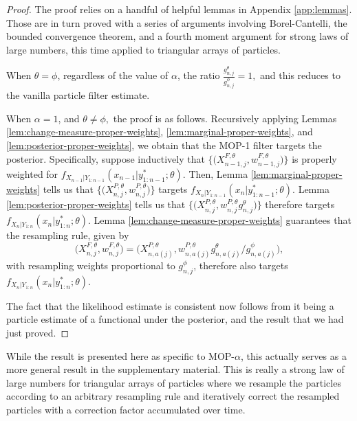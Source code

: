 \documentclass{article}
\begin{document}
\begin{proof}
    The proof relies on a handful of helpful lemmas in Appendix \ref{app:lemmas}. Those are in turn proved with a series of arguments involving Borel-Cantelli, the bounded convergence theorem, and a fourth moment argument for strong laws of large numbers, this time applied to triangular arrays of particles.
    
    When $\theta=\phi$, regardless of the value of $\alpha$, the ratio $\frac{g_{n,j}^\theta}{g_{n,j}^\phi}=1,$ and this reduces to the vanilla particle filter estimate.

    When $\alpha=1$, and $\theta\neq\phi,$ the proof is as follows. Recursively applying Lemmas \ref{lem:change-measure-proper-weights}, \ref{lem:marginal-proper-weights}, and \ref{lem:posterior-proper-weights}, we obtain that 
    the MOP-1 filter targets the posterior.
    Specifically, suppose inductively that $\big\{\big(X^{F,\theta}_{n-1,j},w^{F,\theta}_{n-1,j}\big)\big\}$ is properly weighted for $f_{X_{n-1}|Y_{1:n-1}}(x_{n-1}|y^*_{1:n-1};\theta)$.
    Then, Lemma \ref{lem:marginal-proper-weights} tells us that $\big\{\big(X^{P,\theta}_{n,j},w^{P,\theta}_{n,j}\big)\big\}$ targets $f_{X_{n}|Y_{1:n-1}}(x_{n}|y^*_{1:n-1};\theta)$.
    Lemma \ref{lem:posterior-proper-weights} tells us that $\big\{\big(X^{P,\theta}_{n,j},w^{P,\theta}_{n,j} g^\theta_{n,j} \big)\big\}$ therefore targets  $f_{X_{n}|Y_{1:n}}(x_{n}|y^*_{1:n};\theta)$.
    Lemma \ref{lem:change-measure-proper-weights} guarantees that the resampling rule, given by 
    \[
    \big(X^{F,\theta}_{n,j},w^{F,\theta}_{n,j}\big) = \big(X^{P,\theta}_{n,a(j)}, w^{P,\theta}_{n,a(j)} g^\theta_{n,a(j)}\big/ g^\phi_{n,a(j)}\big),
    \]
    with resampling weights proportional to $g^\phi_{n,j}$, therefore also targets $f_{X_{n}|Y_{1:n}}(x_{n}|y^*_{1:n};\theta)$.

    The fact that the likelihood estimate is consistent now follows from it being a particle estimate of a functional under the posterior, and the result that we had just proved.
\end{proof}

While the result is presented here as specific to MOP-$\alpha$, this actually serves as a more general result in the supplementary material. This is really a strong law of large numbers for triangular arrays of particles where we resample the particles according to an arbitrary resampling rule and iteratively correct the resampled particles with a correction factor accumulated over time.
\end{document}
